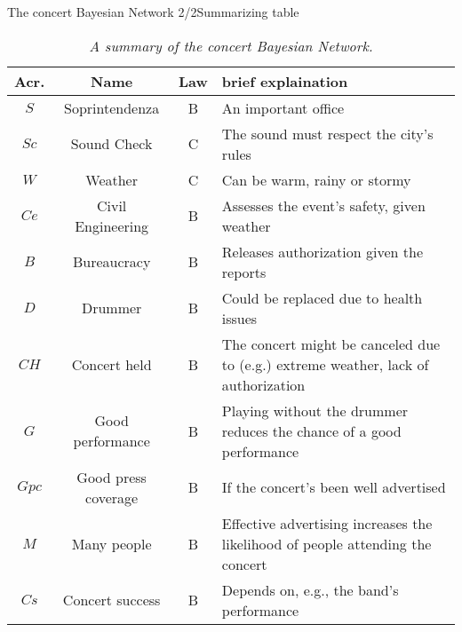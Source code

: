\documentclass[10pt,xcolor={table,dvipsnames}]{beamer} 		%
\theoremstyle{plain}					%
\theoremstyle{definition}
\theoremstyle{remark}
\begin{document}
	\begin{frame}{The concert Bayesian Network 2/2}{Summarizing table}
		\begin{table}[ht]
			\caption{\emph{A summary of the concert Bayesian Network.}}%
			\label{tab:BNsummary}
			\begin{tabularx}{\textwidth}{cccX}
				\toprule
				Acr. & Name & Law & brief explaination\\
				\midrule
				$S$ & Soprintendenza & B & An important office\\
				$Sc$ & Sound Check & C & The sound must respect the city's rules\\
				$W$ & Weather & C & Can be warm, rainy or stormy \\
				$Ce$ & Civil Engineering & B & Assesses the event's safety, given weather\\
				$B$ & Bureaucracy & B & Releases authorization given the reports\\
				$D$ & Drummer & B & Could be replaced due to health issues\\
				$CH$ & Concert held & B & The concert might be canceled due to (e.g.) extreme weather, lack 
											of authorization\\
				$G$ & Good performance & B & Playing without the drummer reduces the chance of a good performance\\
				$Gpc$ & Good press coverage & B & If the concert's been well advertised\\
				$M$ & Many people & B & Effective advertising increases the 
										likelihood of people attending the concert\\
				$Cs$ & Concert success & B & Depends on, e.g., the band's performance\\
				\bottomrule
			\end{tabularx}
		\end{table}
	\end{frame}
\end{document}
